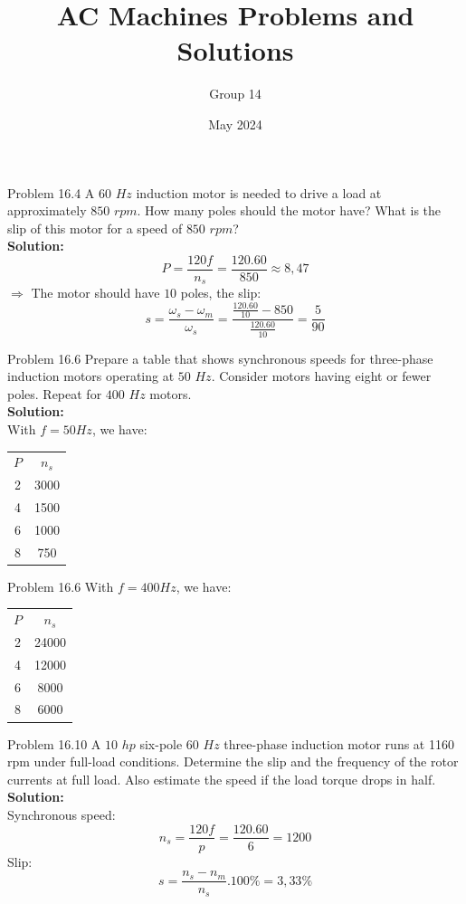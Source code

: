 \documentclass[11pt,aspectratio=169]{beamer}
\title{AC Machines Problems and Solutions}
\author{Group 14}
\date{May 2024}
\begin{document}
\maketitle
\begin{frame}{Problem 16.4}
A $60$ $Hz$ induction motor is needed to drive 
a load at approximately $850$ $rpm$. How many 
poles should the motor have? What is the 
slip of this motor for a speed of $850$ $rpm$?
\\ \textbf{Solution:}
    $$P=\frac{120f}{n_{s}}=\frac{120.60}{850}\approx8,47$$
    $\Rightarrow$ The motor should have $10$ poles, the slip:
    $$s=\frac{\omega_{s}-\omega_{m}}{\omega_{s}}=\frac{\frac{120.60}{10}-850}{\frac{120.60}{10}}=\frac{5}{90}$$
\end{frame}
\begin{frame}{Problem 16.6}
    Prepare a table that shows synchronous 
    speeds for three-phase induction motors 
    operating at $50$ $Hz$. Consider motors having 
    eight or fewer poles. Repeat for $400$ $Hz$ 
    motors.
    \\ \textbf{Solution:}
    \\With $f=50 Hz$, we have:
    \begin{center}
       \begin{tabular}{ c | c}
        $P$ & $n_{s}$  \\ 
        2 & 3000  \\  
        4 & 1500\\
        6 & 1000\\
        8 & 750\\
       \end{tabular}
       \end{center}
    \end{frame}
        
    \begin{frame}{Problem 16.6}
    With $f=400 Hz$, we have:
       \begin{center}
          \begin{tabular}{ c | c}
           $P$ & $n_{s}$  \\ 
           2 & 24000  \\  
           4 & 12000\\
           6 & 8000\\
           8 & 6000\\
          \end{tabular}
          \end{center}
\end{frame}
\begin{frame}{Problem 16.10}
    A $10$ $hp$ six-pole $60$ $Hz$ three-phase induction motor runs at 1160 rpm under full-load 
      conditions. Determine the slip and the frequency of the rotor currents at full load.  Also estimate the speed if the load torque 
      drops in half.
      \\ \textbf{Solution:}\\
      Synchronous speed:
      $$n_{s}=\frac{120f}{p}=\frac{120.60}{6}=1200$$
      Slip:
      $$s=\frac{n_{s}-n_{m}}{n_{s}}.100\%=3,33\%$$
\end{frame}
    
\end{document}
